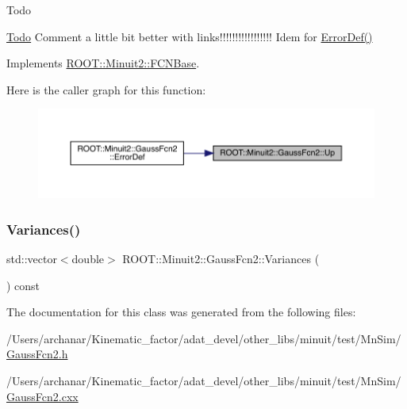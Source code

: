 \begin{DoxyRefDesc}{Todo}
\item[\mbox{\hyperlink{todo__todo000001}{Todo}}]Comment a little bit better with links!!!!!!!!!!!!!!!!! Idem for \mbox{\hyperlink{classROOT_1_1Minuit2_1_1GaussFcn2_ac240f7b6ecbb7bf842d786e3914c620a}{Error\+Def()}}\end{DoxyRefDesc}


Implements \mbox{\hyperlink{classROOT_1_1Minuit2_1_1FCNBase_a04ef08ddad92ce8d89d498efbe021c39}{R\+O\+O\+T\+::\+Minuit2\+::\+F\+C\+N\+Base}}.

Here is the caller graph for this function\+:\nopagebreak
\begin{figure}[H]
\begin{center}
\leavevmode
\includegraphics[width=350pt]{da/d5d/classROOT_1_1Minuit2_1_1GaussFcn2_aef7172f9af50244bc9fce0c96cc21e81_icgraph}
\end{center}
\end{figure}
\mbox{\label{classROOT_1_1Minuit2_1_1GaussFcn2_ae14a0349f83e8ffe7b2b1cda4e138113}} 
\subsubsection{\texorpdfstring{Variances()}{Variances()}}
{\footnotesize\ttfamily std\+::vector$<$double$>$ R\+O\+O\+T\+::\+Minuit2\+::\+Gauss\+Fcn2\+::\+Variances (\begin{DoxyParamCaption}{ }\end{DoxyParamCaption}) const\hspace{0.3cm}{\ttfamily [inline]}}



The documentation for this class was generated from the following files\+:\begin{DoxyCompactItemize}
\item 
/\+Users/archanar/\+Kinematic\+\_\+factor/adat\+\_\+devel/other\+\_\+libs/minuit/test/\+Mn\+Sim/\mbox{\hyperlink{GaussFcn2_8h}{Gauss\+Fcn2.\+h}}\item 
/\+Users/archanar/\+Kinematic\+\_\+factor/adat\+\_\+devel/other\+\_\+libs/minuit/test/\+Mn\+Sim/\mbox{\hyperlink{GaussFcn2_8cxx}{Gauss\+Fcn2.\+cxx}}\end{DoxyCompactItemize}
